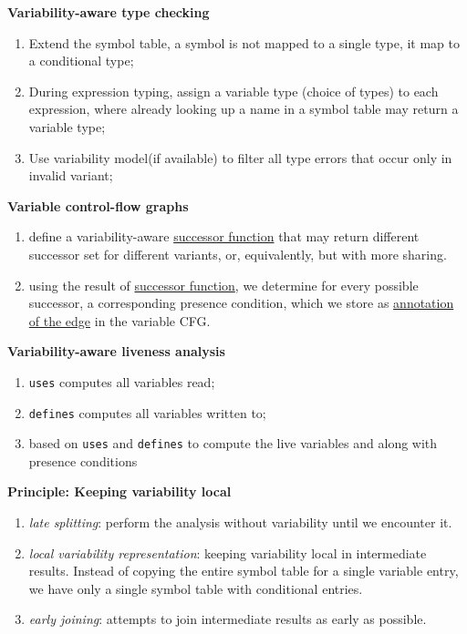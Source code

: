 \documentclass[12pt]{article}
\begin{document}
\textbf{Variability-aware type checking}\\
\begin{enumerate}
	\item Extend the symbol table, a symbol is not mapped to a single type, it map to a conditional type;
	\item During expression typing, assign a variable type (choice of types) to each expression, where already looking up a name in a symbol table may return a variable type;
	\item Use variability model(if available) to filter all type errors that occur only in invalid variant;
\end{enumerate}

\textbf{Variable control-flow graphs}\\
\begin{enumerate}
	\item define a variability-aware \underline{successor function} that may return different successor set for different variants, or, equivalently, but with more sharing.
	\item using the result of \underline{successor function}, we determine for every possible successor, a corresponding presence condition, which we store as \underline{annotation of the edge} in the variable CFG.
\end{enumerate}

\textbf{Variability-aware liveness analysis}\\
\begin{enumerate}
	\item \texttt{uses} computes all variables read;
	\item \texttt{defines} computes all variables written to;
	\item based on \texttt{uses} and \texttt{defines} to compute the live variables and along with presence conditions 
\end{enumerate}

\textbf{Principle: Keeping variability local}\\
\begin{enumerate}
	\item \textit{late splitting}: perform the analysis without variability until we encounter it.
	\item \textit{local variability representation}: keeping variability local in intermediate results. Instead of copying the entire symbol table for a single variable entry, we have only a single symbol table with conditional entries.
	\item \textit{early joining}: attempts to join intermediate results as early as possible.
\end{enumerate}
\end{document}
